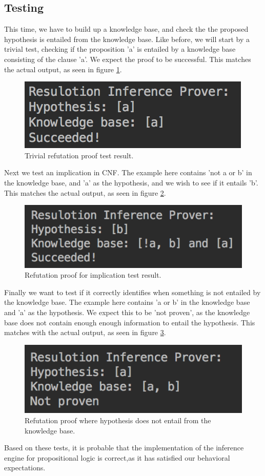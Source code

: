 \subsection{Testing}

This time, we have to build up a knowledge base, and check the the proposed hypothesis is entailed from the knowledge base. Like before, we will start by a trivial test, checking if the proposition 'a' is entailed by a knowledge base consisting of the clause 'a'. We expect the proof to be successful. This matches the actual output, as seen in figure \ref{fig:RPtest1}.

\begin{figure}[H]
    \centering
    \includegraphics[width=0.3\linewidth]{ResolutionProver/RPtest1.png}
    \caption{Trivial refutation proof test result.}
    \label{fig:RPtest1}
\end{figure}

Next we test an implication in CNF. The example here contains 'not a or b' in the knowledge base, and 'a' as the hypothesis, and we wish to see if it entails 'b'. This matches the actual output, as seen in figure \ref{fig:RPtest2}.

\begin{figure}[H]
    \centering
    \includegraphics[width=0.3\linewidth]{ResolutionProver/RPtest2.png}
    \caption{Refutation proof for implication test result.}
    \label{fig:RPtest2}
\end{figure}

Finally we want to test if it correctly identifies when something is not entailed by the knowledge base. The example here contains 'a or b' in the knowledge base and 'a' as the hypothesis. We expect this to be 'not proven', as the knowledge base does not contain enough enough information to entail the hypothesis. This matches with the actual output, as seen in figure \ref{fig:RPtest3}.

\begin{figure}[H]
    \centering
    \includegraphics[width=0.3\linewidth]{ResolutionProver/RPtest3.png}
    \caption{Refutation proof where hypothesis does not entail from the knowledge base.}
    \label{fig:RPtest3}
\end{figure}

Based on these tests, it is probable that the implementation of the inference engine for propositional logic is correct,as it has satisfied our behavioral expectations.
